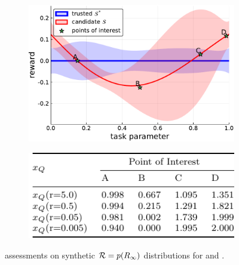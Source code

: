 \begin{figure}[tbp]
    \centering
    \begin{subfigure}[c]{0.65\linewidth}
        \centering
        \includegraphics[width=0.7\linewidth]{Figures/p1.pdf}
        \vfill
    \end{subfigure}%
    \hfill
    \begin{subfigure}[t]{0.35\linewidth}
        \centering
        \includegraphics[width=1.0\linewidth]{Figures/p1_table.pdf}
    \end{subfigure} 
    \caption{\xQ{} assessments on synthetic $\mathcal{R}=p(R_{\infty})$ distributions for \solvetrust{} and \solve{}.} %
    \label{fig:sq_thry1}
\end{figure}
